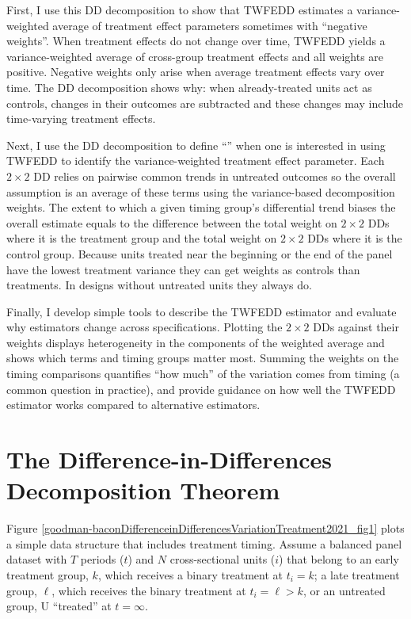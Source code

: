 \documentclass[12pt]{article}
\newcommand{\highlightB}[1]{{\emph{\color{MyBlue}{#1}}}}
\newcommand{\highlightP}[1]{{\emph{\color{MyPink}{#1}}}}
\theoremstyle{definition}
\begin{document}
First, I use this DD decomposition to show that TWFEDD estimates a variance-weighted average of treatment effect parameters sometimes with ``negative weights''. When treatment effects do not change over time, TWFEDD yields a variance-weighted average of cross-group treatment effects and all weights are positive. Negative weights only arise when average treatment effects vary over time. The DD decomposition shows why: when already-treated units act as controls, changes in their outcomes are subtracted and these changes may include time-varying treatment effects. 

Next, I use the DD decomposition to define ``\highlightB{common trends}'' when one is interested in using TWFEDD to identify the variance-weighted treatment effect parameter. Each $2 \times 2$ DD relies on pairwise common trends in untreated outcomes so the overall assumption is an average of these terms using the variance-based decomposition weights. The extent to which a given timing group's differential trend biases the overall estimate equals to the difference between the total weight on $2 \times 2$ DDs where it is the treatment group and the total weight on $2 \times 2$ DDs where it is the control group. Because units treated near the beginning or the end of the panel have the lowest treatment variance they can get \highlightP{more} weights as controls than treatments. In designs without untreated units they always do.

Finally, I develop simple tools to describe the TWFEDD estimator and evaluate why estimators change across specifications. Plotting the $2 \times 2$ DDs against their weights displays heterogeneity in the components of the weighted average and shows which terms and timing groups matter most. Summing the weights on the timing comparisons quantifies ``how much'' of the variation comes from timing (a common question in practice), and provide guidance on how well the TWFEDD estimator works compared to alternative estimators. 

\section{The Difference-in-Differences Decomposition Theorem}

Figure \ref{goodman-baconDifferenceinDifferencesVariationTreatment2021_fig1} plots a simple data structure that includes treatment timing. Assume a balanced panel dataset with $T$ periods ($t$) and $N$ cross-sectional units ($i$) that belong to an early treatment group, $k$, which receives a binary treatment at $t_i = k$; a late treatment group, $\ell$, which receives the binary treatment at $t_i = \ell > k$, or an untreated group, U ``treated'' at $t = \infty$.
\end{document}
